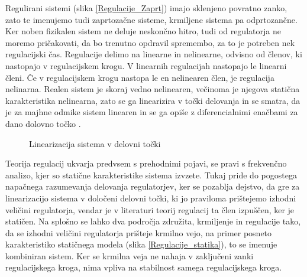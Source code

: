 \documentclass[a4paper,twoside,openright,12pt]{book}
\begin{document}
Regulirani sistemi (slika \ref{Regulacije_Zaprt}) imajo sklenjeno povratno zanko, zato te imenujemo
tudi zaprtozačne sisteme, krmiljene sistema pa odprtozančne. Ker noben fizikalen sistem ne deluje neskončno hitro, tudi od regulatorja ne moremo pričakovati, da bo trenutno opdravil spremembo, za to je potreben nek regulacijski čas. Regulacije delimo na linearne in nelinearne, odvisno od  členov, ki nastopajo v regulacijskem krogu. V linearnih regulacijah nastopajo le linearni členi. Če v regulacijskem krogu nastopa le en nelinearen člen, je regulacija nelinarna. Realen sistem je skoraj vedno nelinearen, večinoma je njegova statična karakteristika nelinearna, zato se ga linearizira v točki delovanja in se smatra, da je za majhne odmike sistem linearen in se ga opiše z diferencialnimi enačbami za dano dolovno točko \cite{Cajhen1990regulacije}.\\ 
\begin{figure}[h]
	\centering
	\caption{\label{Regulacije_linearizacija}Linearizacija sistema v delovni točki}
\end{figure}
Teorija regulacij ukvarja predvsem s prehodnimi pojavi, se pravi s frekvenčno analizo, kjer so statične karakteristike sistema izvzete. Tukaj pride do pogostega napačnega razumevanja delovanja regulatorjev, ker se pozablja dejstvo, da gre za linearizacijo sistema v določeni delovni točki, ki jo praviloma prištejemo izhodni veličini regulatorja, vendar je v literaturi teorij regulacij ta člen izpuščen, ker je statičen. Na splošno se lahko dva področja združita, krmiljenje in regulacije tako, da se izhodni veličini regulatorja prišteje krmilno vejo, na primer posneto karakteristiko statičnega modela (slika \ref{Regulacije_statika}), to se imenuje kombiniran sistem. Ker se krmilna veja ne nahaja v zaključeni zanki regulacijskega kroga, nima vpliva na stabilnost samega regulacijskega kroga.\\ 
\end{document}
